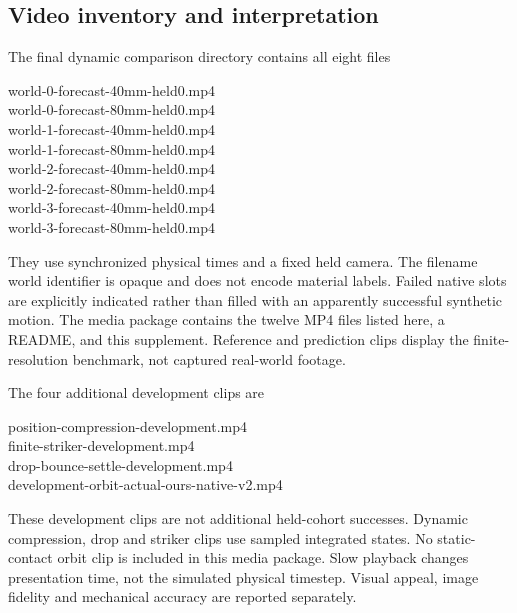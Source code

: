 \documentclass[10pt,twocolumn,letterpaper]{article}
\begin{document}
\subsection{Video inventory and interpretation}
The final dynamic comparison directory contains all eight files
\begin{center}
\small\ttfamily
world-0-forecast-40mm-held0.mp4\\
world-0-forecast-80mm-held0.mp4\\
world-1-forecast-40mm-held0.mp4\\
world-1-forecast-80mm-held0.mp4\\
world-2-forecast-40mm-held0.mp4\\
world-2-forecast-80mm-held0.mp4\\
world-3-forecast-40mm-held0.mp4\\
world-3-forecast-80mm-held0.mp4
\end{center}
They use synchronized physical times and a fixed held camera. The filename world identifier is opaque and does not encode material labels. Failed native slots are explicitly indicated rather than filled with an apparently successful synthetic motion. The media package contains the twelve MP4 files listed here, a README, and this supplement. Reference and prediction clips display the finite-resolution benchmark, not captured real-world footage.

The four additional development clips are
\begin{center}
\small\ttfamily
position-compression-development.mp4\\
finite-striker-development.mp4\\
drop-bounce-settle-development.mp4\\
development-orbit-actual-ours-native-v2.mp4
\end{center}
These development clips are not additional held-cohort successes. Dynamic compression, drop and striker clips use sampled integrated states. No static-contact orbit clip is included in this media package. Slow playback changes presentation time, not the simulated physical timestep. Visual appeal, image fidelity and mechanical accuracy are reported separately.
\end{document}
